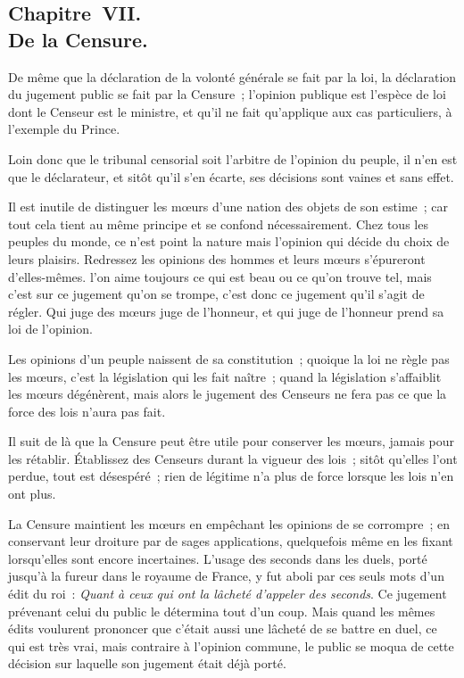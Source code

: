\documentclass[french,twoside]{book} %
\begin{document}
\subsection[{Chapitre VII. De la Censure.}]{Chapitre VII. \\
De la Censure.}
\noindent De même que la déclaration de la volonté générale se fait par la loi, la déclaration du jugement public se fait par la Censure ; l’opinion publique est l’espèce de loi dont le Censeur est le ministre, et qu’il ne fait qu’applique aux cas particuliers, à l’exemple du Prince.\par
Loin donc que le tribunal censorial soit l’arbitre de l’opinion du peuple, il n’en est que le déclarateur, et sitôt qu’il s’en écarte, ses décisions sont vaines et sans effet.\par
Il est inutile de distinguer les mœurs d’une nation des objets de son estime ; car tout cela tient au même principe et se confond nécessairement. Chez tous les peuples du monde, ce n’est point la nature mais l’opinion qui décide du choix de leurs plaisirs. Redressez les opinions des hommes et leurs mœurs s’épureront d’elles-mêmes. l’on aime toujours ce qui est beau ou ce qu’on trouve tel, mais c’est sur ce jugement qu’on se trompe, c’est donc ce jugement qu’il s’agit de régler. Qui juge des mœurs juge de l’honneur, et qui juge de l’honneur prend sa loi de l’opinion.\par
Les opinions d’un peuple naissent de sa constitution ; quoique la loi ne règle pas les mœurs, c’est la législation qui les fait naître ; quand la législation s’affaiblit les mœurs dégénèrent, mais alors le jugement des Censeurs ne fera pas ce que la force des lois n’aura pas fait.\par
Il suit de là que la Censure peut être utile pour conserver les mœurs, jamais pour les rétablir. Établissez des Censeurs durant la vigueur des lois ; sitôt qu’elles l’ont perdue, tout est désespéré ; rien de légitime n’a plus de force lorsque les lois n’en ont plus.\par
La Censure maintient les mœurs en empêchant les opinions de se corrompre ; en conservant leur droiture par de sages applications, quelquefois même en les fixant lorsqu’elles sont encore incertaines. L’usage des seconds dans les duels, porté jusqu’à la fureur dans le royaume de France, y fut aboli par ces seuls mots d’un édit du roi : {\itshape Quant à ceux qui ont la lâcheté d’appeler des seconds}. Ce jugement prévenant celui du public le détermina tout d’un coup. Mais quand les mêmes édits voulurent prononcer que c’était aussi une lâcheté de se battre en duel, ce qui est très vrai, mais contraire à l’opinion commune, le public se moqua de cette décision sur laquelle son jugement était déjà porté.\par
\end{document}
